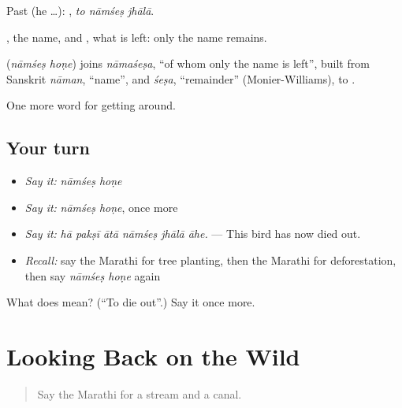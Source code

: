 Past (he …):   , \emph{to nāmśeṣ jhālā}.

, the name, and , what is left: only the name remains.

\begin{cousinweb}
\textbf{ } (\emph{nāmśeṣ hoṇe}) joins \emph{nāmaśeṣa}, \textquotedblleft{}of whom only the name is left\textquotedblright{}, built from Sanskrit \emph{nāman}, \textquotedblleft{}name\textquotedblright{}, and \emph{śeṣa}, \textquotedblleft{}remainder\textquotedblright{} (Monier-Williams), to \textbf{}.
\end{cousinweb}

\begin{grammarlens}[title={What you've built}]
One more word for getting around.
\end{grammarlens}

\subsection*{Your turn}
\begin{itemize}
\raggedright
  \item \emph{Say it:} \emph{nāmśeṣ hoṇe}
  \item \emph{Say it:} \emph{nāmśeṣ hoṇe}, once more
  \item \emph{Say it:} \emph{hā pakṣī ātā nāmśeṣ jhālā āhe.} — This bird has now died out.
  \item \emph{Recall:} say the Marathi for tree planting, then the Marathi for deforestation, then say \emph{nāmśeṣ hoṇe} again
\end{itemize}

\begin{tcolorbox}[breakable,colback=teal!4,colframe=teal!35!black,title={Before you move on}]
What does   mean? (\textquotedblleft{}To die out\textquotedblright{}.) Say it once more.
\end{tcolorbox}
\section[(dialogue)]{Looking Back on the Wild}

\label{lesson:MR-R449-review-443-449}



\begin{quote}
Say the Marathi for a stream and a canal.
\end{quote}

